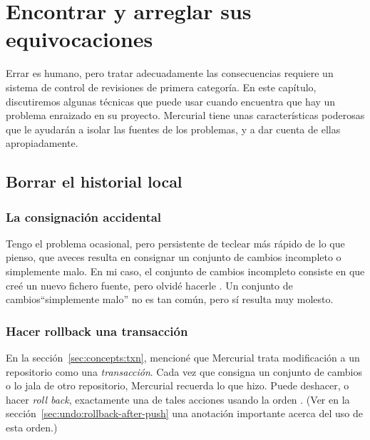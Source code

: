 \chapter{Encontrar y arreglar sus equivocaciones}
\label{chap:undo}

Errar es humano, pero tratar adecuadamente las consecuencias requiere
un sistema de control de revisiones de primera categoría.  En este
capítulo, discutiremos algunas técnicas que puede usar cuando
encuentra que hay un problema enraizado en su proyecto.  Mercurial
tiene unas características poderosas que le ayudarán a isolar las
fuentes de los problemas, y a dar cuenta de ellas apropiadamente.

\section{Borrar el historial local}

\subsection{La consignación accidental}

Tengo el problema ocasional, pero persistente de teclear más rápido de
lo que pienso, que aveces resulta en consignar un conjunto de cambios
incompleto o simplemente malo. En mi caso, el conjunto de cambios
incompleto consiste en que creé un nuevo fichero fuente, pero olvidé
hacerle .  Un conjunto de cambios``simplemente malo'' no es
tan común, pero sí resulta muy molesto.

\subsection{Hacer rollback una transacción}
\label{sec:undo:rollback}

En la sección~\ref{sec:concepts:txn}, mencioné que Mercurial trata
modificación a un repositorio como una \emph{transacción}.  Cada vez
que consigna un conjunto de cambios o lo jala de otro repositorio,
Mercurial recuerda lo que hizo.  Puede deshacer, o hacer \emph{roll back},
exactamente una de tales acciones usando la orden .
(Ver en la sección~\ref{sec:undo:rollback-after-push} una anotación
importante acerca del uso de esta orden.)

